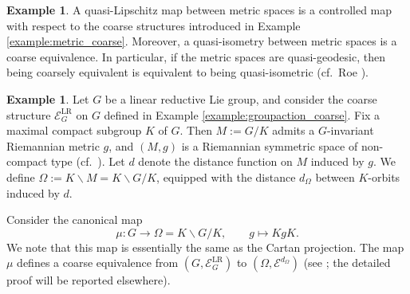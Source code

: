 \documentclass[12pt, a4paper]{amsart}
\theoremstyle{definition}
\newtheorem{example}[theorem]{Example}
\newtheorem{remark}[theorem]{Remark}
\begin{document}


\begin{example}
A quasi-Lipschitz map between metric spaces is a controlled map with respect to the coarse structures introduced in Example \ref{example:metric_coarse}. Moreover, a quasi-isometry between metric spaces is a coarse equivalence. In particular, if the metric spaces are quasi-geodesic, then being coarsely equivalent is equivalent to being quasi-isometric (cf.~Roe \cite[Lemma 1.10]{Roe2003LectureCoarse}).
\end{example}

\begin{example}\label{example:Cartan}
Let $G$ be a linear reductive Lie group, and consider the coarse structure $\mathcal{E}^{\mathrm{LR}}_G$ on $G$ defined in 
Example \ref{example:groupaction_coarse}.
Fix a maximal compact subgroup $K$ of $G$. Then $M := G/K$ admits a $G$-invariant Riemannian metric $g$, and $(M,g)$ is a Riemannian symmetric space of non-compact type (cf.~\cite{HelgasonDiff}). Let $d$ denote the distance function on $M$ induced by $g$. We define $\Omega := K \backslash M = K \backslash G/K$, equipped with the distance $d_\Omega$ between $K$-orbits induced by $d$.

Consider the canonical map
\[
\mu : G \rightarrow \Omega = K \backslash G/K, \qquad g \mapsto KgK.
\]
We note that this map is essentially the same as the Cartan projection. The map $\mu$ defines a coarse equivalence from $(G,\mathcal{E}^{\mathrm{LR}}_G)$ to $(\Omega,\mathcal{E}^{d_\Omega})$ (see \cite[Example 5.5]{NagayaOgawaOkuda2025};  the detailed proof will be reported elsewhere).
\end{example}
\end{document}
